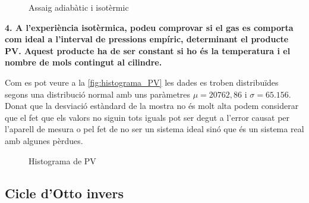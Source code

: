\documentclass[a4paper]{article}
\begin{document}
\begin{figure}[!h]
\centering
\caption{Assaig adiabàtic  i isotèrmic}
\label{fig:asssaig_ad_iso}
\end{figure}

\textbf{4. A l’experiència isotèrmica, podeu comprovar si el gas es comporta com ideal a l’interval de pressions empíric, determinant el producte PV. Aquest producte ha de ser constant si ho és la temperatura i el nombre de mols contingut al cilindre.}

Com es pot veure a la \autoref{fig:histograma_PV} les dades es troben distribuïdes segons una distribució normal amb uns paràmetres $\mu = 20762,86$ i $\sigma = 65.156$. Donat que la desviació estàndard de la mostra no és molt alta podem considerar que el fet que els valors no siguin tots iguals pot ser degut a l'error causat per l'aparell de mesura o pel fet de no ser un sistema ideal sinó que és un sistema real amb algunes pèrdues.

\begin{figure}[!h]
\centering
\caption{Histograma de PV}
\label{fig:histograma_PV}
\end{figure}

\subsection*{Cicle d'Otto invers}
\end{document}
